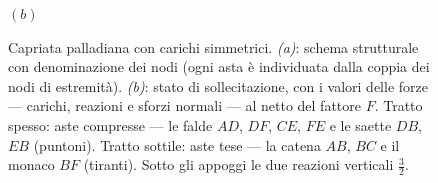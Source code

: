 \begin{figure}[htbp]
\begin{minipage}[t]{0.48\textwidth}
				\par\smallskip$(b)$
			\end{minipage}
			\caption{Capriata palladiana con carichi simmetrici.
				\emph{(a)}: schema strutturale con denominazione dei nodi
				(ogni asta è individuata dalla coppia dei nodi di estremità).
				\emph{(b)}: stato di sollecitazione, con i valori delle forze
				--- carichi, reazioni e sforzi normali --- al netto del fattore $F$.
				Tratto spesso: aste compresse --- le falde $AD$,
				$DF$, $CE$, $FE$ e le saette $DB$, $EB$ (puntoni).
				Tratto sottile: aste tese --- la catena $AB$, $BC$
				e il monaco $BF$ (tiranti). Sotto gli appoggi le due
				reazioni verticali $\tfrac{3}{2}$.}
			\label{fig:capriata_palladiana}
		\end{figure}
